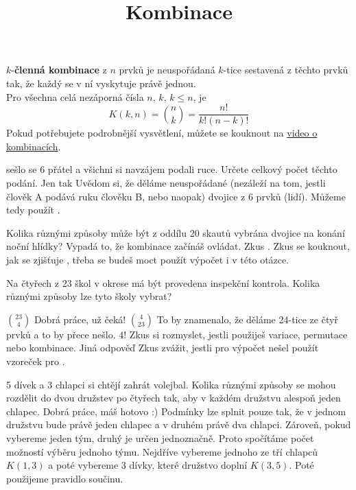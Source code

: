 \documentclass[language = czech]{webquiz}
\title{Kombinace}
\begin{document}
	\begin{discussion}[Kombinace]\label{d1} %
		 $k$-\textbf{členná kombinace} z $n$ prvků je neuspořádaná $k$-tice sestavená z těchto prvků tak, že každý se v ní vyskytuje právě jednou.\\
		 Pro všechna celá nezáporná čísla $n$, $k$, $k\leq n$, je \[K(k,n) = {n\choose k} = \frac{n!}{k!(n-k)!} \]
		 Pokud potřebujete podrobnější vysvětlení, můžete se kouknout na \href{https://www.youtube.com/watch?v=GczXt3pg26Y&t=5s}{video o kombinacích}.
	\end{discussion}
	
	\begin{question} \label{o1} %
		sešlo se 6 přátel a všichni si navzájem podali ruce. Určete celkový počet těchto podání.
		\whenRight Jen tak 
		\whenWrong Uvědom si, že  děláme neuspořádané (nezáleží na tom, jestli člověk A podává ruku člověku B, nebo naopak) dvojice z 6 prvků (lidí). Můžeme tedy použít .
	\end{question}
	
	\begin{question} \label{o2} %
		Kolika různými způsoby může být z oddílu 20 skautů vybrána dvojice na konání noční hlídky?
		\whenRight Vypadá to, že kombinace začínáš ovládat. Zkus .
		\whenWrong Zkus se kouknout, jak se zjišťuje , třeba se budeš moct použít výpočet i v této otázce.
	\end{question}
	
	\begin{question} \label{o3} %
		Na čtyřech z 23 škol v okrese má být provedena inspekční kontrola. Kolika různými způsoby lze tyto školy vybrat?
		\begin{choice}[columns=2]
			\correct ${23\choose 4}$
			\feedback Dobrá práce,  už čeká!
			\incorrect ${4\choose 23}$ 
			\feedback To by znamenalo, že děláme 24-tice ze čtyř prvků a to by přece nešlo.
			\incorrect $4!$
			\feedback Zkus si rozmyslet, jestli použiješ variace, permutace nebo kombinace.
			\incorrect Jiná odpověď 
			\feedback Zkus zvážit, jestli pro výpočet nešel použít vzoreček pro .
		\end{choice}	
	\end{question}
	
	\begin{question} \label{o4} %
		5 dívek a 3 chlapci si chtějí zahrát volejbal. Kolika různými způsoby se mohou rozdělit do dvou družstev po čtyřech tak, aby v každém družstvu alespoň jeden chlapec.
		\whenRight Dobrá práce, máš hotovo :)
		\whenWrong Podmínky lze splnit pouze tak, že v jednom družstvu bude právě jeden chlapec a v druhém právě dva chlapci. Zároveň, pokud vybereme jeden tým, druhý je určen jednoznačně. Proto spočítáme počet možností výběru jednoho týmu. Nejdříve vybereme jednoho ze tří chlapců $K(1,3)$ a poté vybereme 3 dívky, které družstvo doplní $K(3,5)$. Poté použijeme pravidlo součinu.
	\end{question}
	
\end{document}
